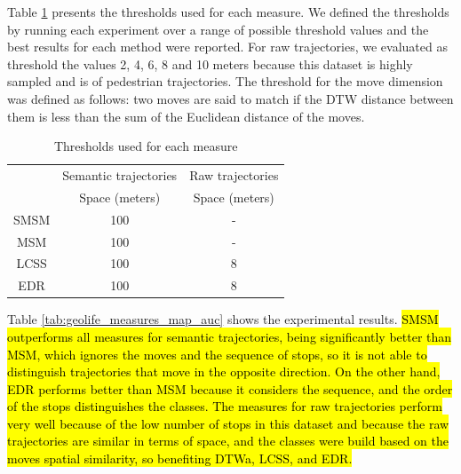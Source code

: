 \documentclass[12pt]{article}
\begin{document}
Table \ref{tab:geolife_thresholds} presents the thresholds used for each measure. We defined the thresholds by running each experiment over a range of possible threshold values and the best results for each method were reported. For raw trajectories, we evaluated as threshold the  values 2, 4, 6, 8 and 10 meters because this dataset is highly sampled and is of pedestrian trajectories. The threshold for the move dimension was defined as follows: two moves are said to match if the DTW distance between them is less than the sum of the Euclidean distance of the moves.

\begin{table}[!h]
\scriptsize
  \centering
  \begin{tabular}{|c|c|c|}
  	\hline
  & \multicolumn{1}{c|}{Semantic trajectories} & \multicolumn{1}{c|}{Raw trajectories} \\
 	\cline{2-3}
  & Space (meters) & Space (meters) \\
  	\hline
 SMSM & 100 & - \\
 MSM & 100 & - \\
 LCSS & 100 & 8 \\
 EDR & 100 & 8 \\
    \hline
  \end{tabular}
  \caption{Thresholds used for each measure}
  \label{tab:geolife_thresholds}
\end{table}

Table \ref{tab:geolife_measures_map_auc} shows the experimental results.  \hl{SMSM outperforms all measures for semantic trajectories, being significantly better than MSM, which ignores the moves and the sequence of stops, so it is not able to distinguish trajectories that move in the opposite direction. On the other hand, EDR performs better than MSM because it considers the sequence, and the order of the stops distinguishes the classes. The measures for raw trajectories perform very well because of the low number of stops in this dataset and because the raw trajectories are similar in terms of space, and the classes were build based on the moves spatial similarity, so benefiting DTWa, LCSS, and EDR. }
\end{document}
